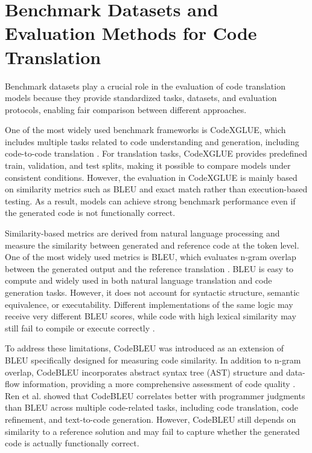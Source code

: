 \section{Benchmark Datasets and Evaluation Methods for Code Translation}

Benchmark datasets play a crucial role in the evaluation of code translation
models because they provide standardized tasks, datasets, and evaluation
protocols, enabling fair comparison between different approaches.

One of the most widely used benchmark frameworks is CodeXGLUE, which includes
multiple tasks related to code understanding and generation, including
code-to-code translation \cite{lu2021codexglue}. For translation tasks,
CodeXGLUE provides predefined train, validation, and test splits, making it
possible to compare models under consistent conditions. However, the evaluation
in CodeXGLUE is mainly based on similarity metrics such as BLEU and exact match
rather than execution-based testing. As a result, models can achieve strong
benchmark performance even if the generated code is not functionally correct.

Similarity-based metrics are derived from natural language processing and
measure the similarity between generated and reference code at the token level.
One of the most widely used metrics is BLEU, which evaluates n-gram overlap
between the generated output and the reference translation
\cite{bleu_metric, chen2021codex, austin2021mbpp}. BLEU is easy to compute and
widely used in both natural language translation and code generation tasks.
However, it does not account for syntactic structure, semantic equivalence, or
executability. Different implementations of the same logic may receive very
different BLEU scores, while code with high lexical similarity may still fail
to compile or execute correctly \cite{tran2019ruby, evtikhiev2022bleu}.

To address these limitations, CodeBLEU was introduced as an extension of BLEU
specifically designed for measuring code similarity. In addition to n-gram
overlap, CodeBLEU incorporates abstract syntax tree (AST) structure and
data-flow information, providing a more comprehensive assessment of code quality
\cite{ren2020codebleu}. Ren et al. showed that CodeBLEU correlates better with
programmer judgments than BLEU across multiple code-related tasks, including
code translation, code refinement, and text-to-code generation. However,
CodeBLEU still depends on similarity to a reference solution and may fail to
capture whether the generated code is actually functionally correct.

